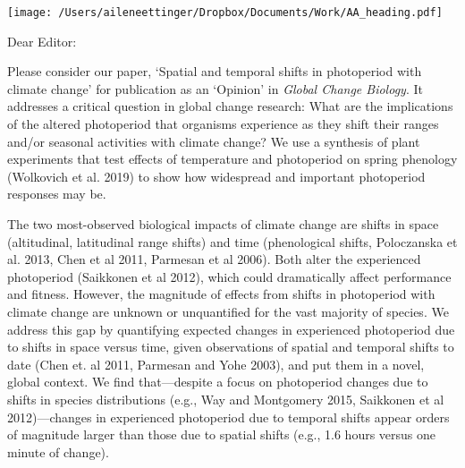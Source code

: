 \documentclass[10.7pt,a4paper]{letter} %
\begin{document}

\begin{letter}{}
\texttt{[image: /Users/aileneettinger/Dropbox/Documents/Work/AA\_heading.pdf]}

\opening{Dear Editor:}
Please consider our paper, `Spatial and temporal shifts in photoperiod with climate change' for publication as an `Opinion' in \emph{Global Change Biology}. It addresses a critical question in global change research: What are the implications of the altered photoperiod that organisms experience as they shift their ranges and/or seasonal activities with climate change? We use a synthesis of plant experiments that test effects of temperature and photoperiod on spring phenology (Wolkovich et al. 2019) to show how widespread and important photoperiod responses may be.

The two most-observed biological impacts of climate change are shifts in space (altitudinal, latitudinal range shifts) and time (phenological shifts, Poloczanska et al. 2013, Chen et al 2011, Parmesan et al 2006). Both alter the experienced photoperiod (Saikkonen et al 2012), which could dramatically affect performance and fitness. However, the magnitude of effects from shifts in photoperiod with climate change are unknown or unquantified for the vast majority of species.  We address this gap by quantifying expected changes in experienced photoperiod due to shifts in space versus time, given observations of spatial and temporal shifts to date (Chen et. al 2011, Parmesan and Yohe 2003), and put them in a novel, global context. We find that---despite a focus on photoperiod changes due to shifts in species distributions (e.g., Way and Montgomery 2015, Saikkonen et al 2012)---changes in experienced photoperiod due to temporal shifts appear orders of magnitude larger than those due to spatial shifts (e.g., 1.6 hours versus one minute of change). %


\end{letter}
\end{document}
